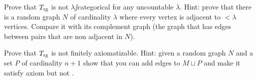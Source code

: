 \documentclass[creche.tex]{subfiles}
\begin{document}
%
%

%

\begin{exercise}
Prove that $T_{\rm rg}$ is not $\lambda\jj$categorical for any uncountable $\lambda$.
Hint: prove that there is a random graph $N$ of cardinality $\lambda$ where every vertex is adjacent to $<\lambda$ vertices.
Compare it with its complement graph (the graph that has edges between pairs that are non adjacent in $N$).\QED
\end{exercise}

\begin{exercise}
Prove that $T_{\rm rg}$ is not finitely axiomatizable.
Hint: given a random graph $N$ and a set $P$ of cardinality $n+1$ show that you can add edges to $M\sqcup P$ and make it satisfy axiom  but not .\QED
\end{exercise}
\end{document}
